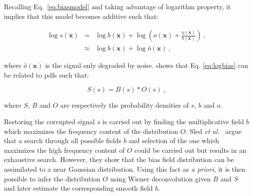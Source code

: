{Recalling Eq.~\eqref{eq:biasmodel} and taking advantage of logarithm property, it implies that this model becomes additive such that:

\begin{eqnarray}
	\log s(\mathbf{x}) & = & \log b(\mathbf{x}) + \log \left( o(\mathbf{x}) + \frac{\eta(\mathbf{x})}{b(\mathbf{x})} \right) \ , \nonumber \\
	& \approx & \log b(\mathbf{x}) + \log \hat{o}(\mathbf{x}) \ , \label{eq:logbias}
\end{eqnarray}

\noindent where $\hat{o}(\mathbf{x})$ is the signal only degraded by noise. \cite{Sled1998} shows that Eq. \eqref{eq:logbias} can be related to \acp{pdf} such that:

\begin{equation}
	S(s) = B(s) * O(s) \ ,
	\label{eq:distrbias} 
\end{equation}

\noindent where $S$, $B$ and $O$ are respectively the probability densities of $s$, $b$ and $o$.

Restoring the corrupted signal $s$ is carried out by finding the multiplicative field $b$ which maximizes the frequency content of the distribution $O$.
Sled \textit{et al.}~\cite{Sled1998} argue that a search through all possible fields $b$ and selection of the one which maximizes the high frequency content of $O$ could be carried out but results in an exhaustive search.
However, they show that the bias field distribution can be assimilated to a near Gaussian distribution.
Using this fact as \textit{a priori}, it is then possible to infer the distribution $O$ using Wiener deconvolution given $B$ and $S$ and later estimate the corresponding smooth field $b$.
}

